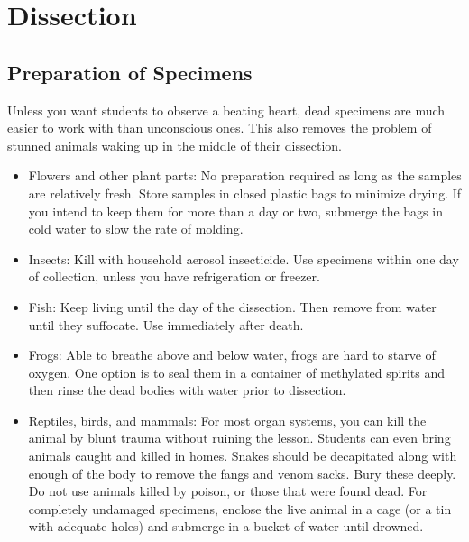 \chapter{Dissection} 

\section{Preparation of Specimens} 

Unless you want students to observe a beating heart, 
dead specimens are much easier to work with than unconscious ones. 
This also removes the problem of stunned animals waking up 
in the middle of their dissection.

\begin{itemize}

\item{Flowers and other plant parts: 
No preparation required as long as the samples are relatively fresh. 
Store samples in closed plastic bags to minimize drying. 
If you intend to keep them for more than a day or two, 
submerge the bags in cold water to slow the rate of molding.}

\item{Insects: Kill with household aerosol insecticide. 
Use specimens within one day of collection, 
unless you have refrigeration or freezer.}

\item{Fish: Keep living until the day of the dissection. 
Then remove from water until they suffocate. 
Use immediately after death.}

\item{Frogs: Able to breathe above and below water, 
frogs are hard to starve of oxygen. 
One option is to seal them in a container of methylated spirits 
and then rinse the dead bodies with water prior to dissection.}

\item{Reptiles, birds, and mammals: For most organ systems, 
you can kill the animal by blunt trauma without ruining the lesson. 
Students can even bring animals caught and killed in homes. 
Snakes should be decapitated along with enough of the body 
to remove the fangs and venom sacks. 
Bury these deeply. 
Do not use animals killed by poison, 
or those that were found dead. 
For completely undamaged specimens, 
enclose the live animal in a cage (or a tin with adequate holes) 
and submerge in a bucket of water until drowned.}


\end{itemize}
